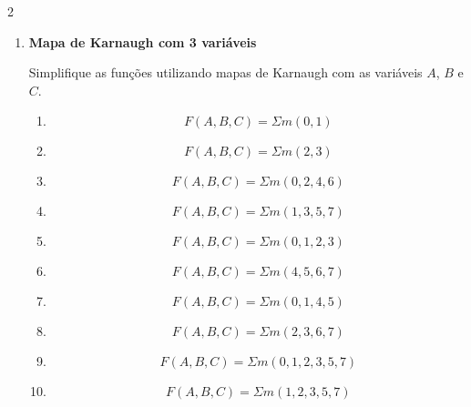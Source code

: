 \documentclass[a4paper,12pt]{article}
\begin{document}
\begin{multicols}{2}
\begin{enumerate}[leftmargin=*]
\begin{enumerate}[label=(\Alph*)]
    \item
    \[
        F(A,B)=\Sigma m(0,2,3)
    \]

    \item
    \[
        F(A,B)=\Sigma m(0,1,2,3)
    \]

\end{enumerate}

\vspace{0.5cm}


\item \textbf{Mapa de Karnaugh com 3 variáveis}

Simplifique as funções utilizando mapas de Karnaugh com as variáveis
$A$, $B$ e $C$.

\begin{enumerate}[label=(\Alph*)]

    \item
    \[
        F(A,B,C)=\Sigma m(0,1)
    \]

    \item
    \[
        F(A,B,C)=\Sigma m(2,3)
    \]

    \item
    \[
        F(A,B,C)=\Sigma m(0,2,4,6)
    \]

    \item
    \[
        F(A,B,C)=\Sigma m(1,3,5,7)
    \]

    \item
    \[
        F(A,B,C)=\Sigma m(0,1,2,3)
    \]

    \item
    \[
        F(A,B,C)=\Sigma m(4,5,6,7)
    \]

    \item
    \[
        F(A,B,C)=\Sigma m(0,1,4,5)
    \]

    \item
    \[
        F(A,B,C)=\Sigma m(2,3,6,7)
    \]

    \item
    \[
        F(A,B,C)=\Sigma m(0,1,2,3,5,7)
    \]

    \item
    \[
        F(A,B,C)=\Sigma m(1,2,3,5,7)
    \]

\end{enumerate}

\vspace{0.5cm}


\end{enumerate}
\end{multicols}
\end{document}
